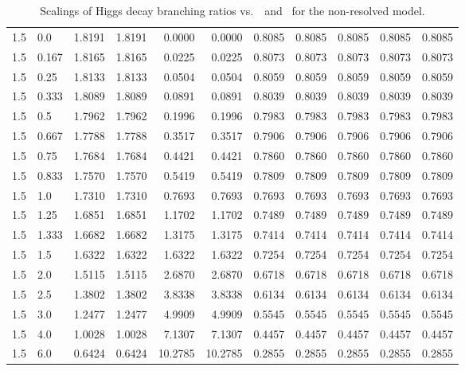 \begin{table}[h!]
\begin{tabular}{ll rrrrrrrrr}
   1.5  & 0.0    & 1.8191 & 1.8191 & 0.0000  & 0.0000  & 0.8085 & 0.8085 & 0.8085 & 0.8085 & 0.8085 \\
   1.5  & 0.167  & 1.8165 & 1.8165 & 0.0225  & 0.0225  & 0.8073 & 0.8073 & 0.8073 & 0.8073 & 0.8073 \\
   1.5  & 0.25   & 1.8133 & 1.8133 & 0.0504  & 0.0504  & 0.8059 & 0.8059 & 0.8059 & 0.8059 & 0.8059 \\
   1.5  & 0.333  & 1.8089 & 1.8089 & 0.0891  & 0.0891  & 0.8039 & 0.8039 & 0.8039 & 0.8039 & 0.8039 \\
   1.5  & 0.5    & 1.7962 & 1.7962 & 0.1996  & 0.1996  & 0.7983 & 0.7983 & 0.7983 & 0.7983 & 0.7983 \\
   1.5  & 0.667  & 1.7788 & 1.7788 & 0.3517  & 0.3517  & 0.7906 & 0.7906 & 0.7906 & 0.7906 & 0.7906 \\
   1.5  & 0.75   & 1.7684 & 1.7684 & 0.4421  & 0.4421  & 0.7860 & 0.7860 & 0.7860 & 0.7860 & 0.7860 \\
   1.5  & 0.833  & 1.7570 & 1.7570 & 0.5419  & 0.5419  & 0.7809 & 0.7809 & 0.7809 & 0.7809 & 0.7809 \\
   1.5  & 1.0    & 1.7310 & 1.7310 & 0.7693  & 0.7693  & 0.7693 & 0.7693 & 0.7693 & 0.7693 & 0.7693 \\
   1.5  & 1.25   & 1.6851 & 1.6851 & 1.1702  & 1.1702  & 0.7489 & 0.7489 & 0.7489 & 0.7489 & 0.7489 \\
   1.5  & 1.333  & 1.6682 & 1.6682 & 1.3175  & 1.3175  & 0.7414 & 0.7414 & 0.7414 & 0.7414 & 0.7414 \\
   1.5  & 1.5    & 1.6322 & 1.6322 & 1.6322  & 1.6322  & 0.7254 & 0.7254 & 0.7254 & 0.7254 & 0.7254 \\
   1.5  & 2.0    & 1.5115 & 1.5115 & 2.6870  & 2.6870  & 0.6718 & 0.6718 & 0.6718 & 0.6718 & 0.6718 \\
   1.5  & 2.5    & 1.3802 & 1.3802 & 3.8338  & 3.8338  & 0.6134 & 0.6134 & 0.6134 & 0.6134 & 0.6134 \\
   1.5  & 3.0    & 1.2477 & 1.2477 & 4.9909  & 4.9909  & 0.5545 & 0.5545 & 0.5545 & 0.5545 & 0.5545 \\
   1.5  & 4.0    & 1.0028 & 1.0028 & 7.1307  & 7.1307  & 0.4457 & 0.4457 & 0.4457 & 0.4457 & 0.4457 \\
   1.5  & 6.0    & 0.6424 & 0.6424 & 10.2785 & 10.2785 & 0.2855 & 0.2855 & 0.2855 & 0.2855 & 0.2855 \\\hline
    \end{tabular}
    \caption{Scalings of Higgs decay branching ratios vs.\ \Ct\ and \ for the non-resolved model.}\label{tab:brscalingK6_1p5}
 \end{table}

